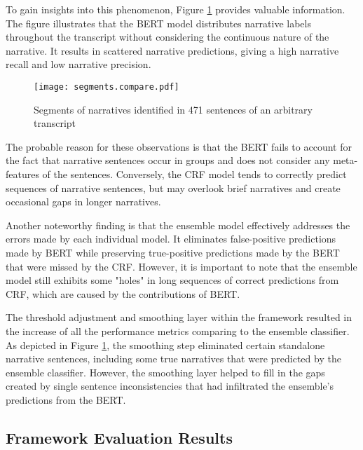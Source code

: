 \documentclass[preprint,12pt]{elsarticle}
\begin{document}
To gain insights into this phenomenon,  Figure \ref{fig:segment.comparison} provides valuable information. The figure illustrates that the BERT model distributes narrative labels throughout the transcript without considering the continuous nature of the narrative. It results in scattered narrative predictions, giving a high narrative recall and low narrative precision.

\begin{figure}[ht]
  \centering
  \texttt{[image: segments.compare.pdf]}
  \caption{Segments of narratives identified in 471 sentences of an arbitrary transcript}
   \label{fig:segment.comparison}
\end{figure}

The probable reason for these observations is that the BERT fails to account for the fact that narrative sentences occur in groups and does not consider any meta-features of the sentences. Conversely, the CRF model tends to correctly predict sequences of narrative sentences, but may overlook brief narratives and create occasional gaps in longer narratives.

Another noteworthy finding is that the ensemble model effectively addresses the errors made by each individual model. It eliminates false-positive predictions made by BERT while preserving true-positive predictions made by the BERT that were missed by the CRF. However, it is important to note that the ensemble model still exhibits some "holes" in long sequences of correct predictions from CRF, which are caused by the contributions of BERT.

The threshold adjustment and smoothing layer within the framework resulted in the increase of all the performance metrics comparing to the ensemble classifier. As depicted in Figure \ref{fig:segment.comparison}, the smoothing step eliminated certain standalone narrative sentences, including some true narratives that were predicted by the ensemble classifier. However, the smoothing layer helped to fill in the gaps created by single sentence inconsistencies that had infiltrated the ensemble's predictions from the BERT.

\subsection{Framework Evaluation Results} \label{sec:Framework Evaluation}
\end{document}
